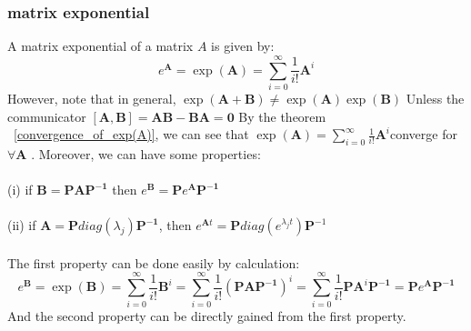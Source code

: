 \documentclass[a4paper]{article}
\begin{document}
\subsubsection{matrix exponential}
A matrix exponential of a matrix $A$ is given by:
\[{{e}^{\mathbf{A}}}=\exp (\mathbf{A})=\sum\limits_{i=0}^{\infty }{\frac{1}{i!}{{\mathbf{A}}^{i}}}\]
However, note that in general,
$\exp (\mathbf{A}+\mathbf{B})\ne \exp (\mathbf{A})\exp (\mathbf{B})$
Unless the communicator $[\mathbf{A,B}]=\mathbf{AB-BA}=\mathbf{0}$
By the theorem ~\ref{convergence_of_exp(A)}, we can see that $\exp (\mathbf{A})=\sum\limits_{i=0}^{\infty }{\frac{1}{i!}{{\mathbf{A}}^{i}}}$converge for $\forall \mathbf{A}$ . Moreover, we can have some properties:
\\\\
(i) if $\mathbf{B=PA}{{\mathbf{P}}^{\mathbf{-1}}}$ then ${{e}^{\mathbf{B}}}\mathbf{=P}{{e}^{\mathbf{A}}}{{\mathbf{P}}^{\mathbf{-1}}}$\\\\
(ii) if $\mathbf{A}=\mathbf{P}diag\left( {{\lambda }_{j}} \right){{\mathbf{P}}^{\mathbf{-1}}}$, then ${{e}^{\mathbf{A}t}}=\mathbf{P}diag\left( {{e}^{{{\lambda }_{j}}t}} \right){{\mathbf{P}}^{-1}}$\\\\
The first property can be done easily by calculation:
\[{{e}^{\mathbf{B}}}\mathbf{=}\exp (\mathbf{B})=\sum\limits_{i=0}^{\infty }{\frac{1}{i!}{{\mathbf{B}}^{i}}}=\sum\limits_{i=0}^{\infty }{\frac{1}{i!}{{\left( \mathbf{PA}{{\mathbf{P}}^{\mathbf{-1}}} \right)}^{i}}}=\sum\limits_{i=0}^{\infty }{\frac{1}{i!}\mathbf{P}{{\mathbf{A}}^{i}}{{\mathbf{P}}^{\mathbf{-1}}}}=\mathbf{P}{{e}^{\mathbf{A}}}{{\mathbf{P}}^{\mathbf{-1}}}\]
And the second property can be directly gained from the first property.
\end{document}
